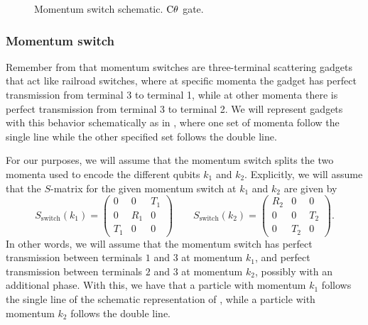 \documentclass[../thesis-main/thesis-main]{subfiles}
\begin{document}
\begin{figure}
\centering
{}
\hspace{0.5cm}
\caption{ Momentum switch schematic.  $\mathrm{C}\theta$ gate.}
\label{fig:onepsplit}
\end{figure}

\subsubsection{Momentum switch}

Remember from  that momentum switches are three-terminal scattering gadgets that act like railroad switches, where at specific momenta the gadget has perfect transmission from terminal 3 to terminal 1, while at other momenta there is perfect transmission from terminal 3 to terminal 2.  We will represent gadgets with this behavior schematically as in , where one set of momenta follow the single line while the other specified set follows the double line.

For our purposes, we will assume that the momentum switch splits the two momenta used to encode the different qubits $k_{1}$ and $k_{2}$.  Explicitly, we will assume that the $S$-matrix for the given momentum switch at $k_1$ and $k_2$ are given by
\begin{equation}
  S_{\text{switch}}(k_{1}) = \begin{pmatrix} 0 & 0 & T_{1}\\
    0 & R_{1} & 0\\
    T_{1} & 0 & 0\end{pmatrix}\qquad
  S_{\text{switch}}(k_{2}) = \begin{pmatrix}R_{2} & 0 &0\\
    0 & 0 & T_{2}\\
    0 & T_{2} & 0\end{pmatrix}.
\label{eq:switch_S}
\end{equation}
In other words, we will assume that the momentum switch has perfect transmission between terminals $1$ and $3$ at momentum $k_{1}$, and perfect transmission between terminals $2$ and $3$ at momentum $k_{2}$, possibly with an additional phase.  With this, we have that a particle with momentum $k_{1}$ follows the single line of the schematic representation of , while a particle with momentum $k_{2}$ follows the double line.
\end{document}
